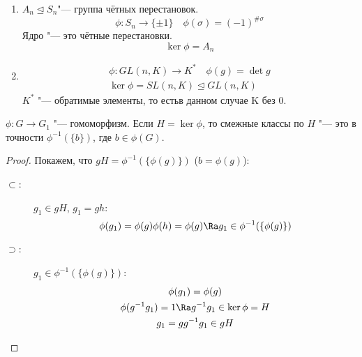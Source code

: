 \begin{exmp}\hfill\begin{enumerate}
\item
	$A_n \unlhd S_n$"--- группа чётных перестановок.
	\[ \phi\colon S_n \to \{\pm 1\} \quad \phi(\sigma) = (-1)^{\#\sigma} \]
	Ядро "--- это чётные перестановки.
	\[ \ker \phi = A_n \]

\item
	\begin{gather*}
		\phi\colon GL(n,K) \to K^* \quad \phi(g) = \det g \\
		\ker \phi = SL(n, K) \unlhd GL(n, K)
	\end{gather*}
	$K^*$ "--- обратимые элементы, то естьв данном случае K без 0.
\end{enumerate}\end{exmp}

\begin{lemma}
	$\phi\colon G \to G_1$ "--- гомоморфизм.
	Если $H = \ker \phi$, то смежные классы по $H$ "--- это в точности $\phi^{-1}(\{b\})$, где $b \in \phi(G)$.
\end{lemma}
\begin{proof}
	Покажем, что $gH = \phi^{-1}(\{\phi(g)\})$ ($b = \phi(g)$):
	\begin{description}
	\item[$\subset$:]
		$g_1 \in gH$, $g_1 = gh$:
		\[ \phi(g_1) = \phi(g)\phi(h) = \phi(g) \Ra g_1 \in \phi^{-1}(\{\phi(g)\}) \]

	\item[$\supset$:]
		$g_1 \in \phi^{-1}(\{\phi(g)\})$:
		\begin{gather*}
			\phi(g_1) = \phi(g) \\
			\phi(g^{-1}g_1) = 1 \Ra g^{-1}g_1 \in \ker \phi = H \\
			g_1 = gg^{-1}g_1 \in gH
		\end{gather*}
	\end{description}
\end{proof}

